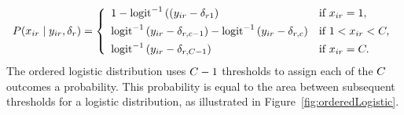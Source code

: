 \documentclass{article}
\newcommand{\Irater}{r}
\newcommand{\Iitem}{i}
\newcommand{\Incat}{c}
\newcommand{\Tncat}{\expandafter\MakeUppercase\expandafter{\Incat}}
\newcommand{\ilogit}[1]{\text{logit}^{-1}\left(#1\right)}
\begin{document}
\begin{align*}
P(x_{\Iitem\Irater}\mid y_{\Iitem\Irater},\delta_{\Irater}) = 
\left\{\begin{array}{ll} 
	1 - \ilogit{(y_{\Iitem\Irater} - \delta_{\Irater 1}}         & \text{if } x_{\Iitem\Irater} = 1, \\[4pt]
	\ilogit{y_{\Iitem\Irater} - \delta_{\Irater,\Incat-1}} - 
	\ilogit{y_{\Iitem\Irater} - \delta_{\Irater,\Incat}}         & \text{if } 1 < x_{\Iitem\Irater} < \Tncat,\\[4pt]
	\ilogit{y_{\Iitem\Irater} - \delta_{\Irater,\Tncat-1}}       & \text{if } x_{\Iitem\Irater} = \Tncat. 
\end{array} \right.
\end{align*}
The ordered logistic distribution uses $\Tncat - 1$ thresholds to assign each of the $\Tncat$ outcomes a probability. This probability is equal to the area between subsequent thresholds for a logistic distribution, as illustrated in Figure~\ref{fig:orderedLogistic}.
\end{document}
